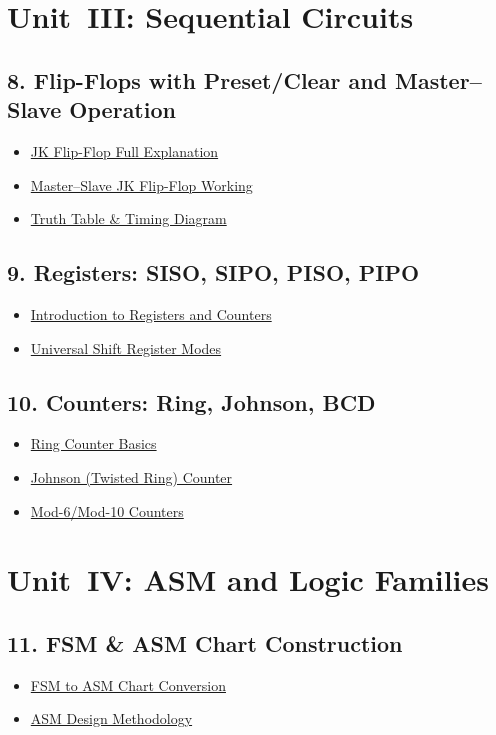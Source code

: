 \documentclass{article}
\begin{document}
\section*{Unit~III: Sequential Circuits}
\subsection*{8. Flip-Flops with Preset/Clear and Master–Slave Operation}
\begin{itemize}
  \item \href{https://www.youtube.com/watch?v=qU7x1XLjhn4}{JK Flip-Flop Full Explanation}
  \item \href{https://www.youtube.com/watch?v=rXHSB5w7CyE}{Master–Slave JK Flip-Flop Working}
  \item \href{https://www.youtube.com/watch?v=ID3og9nvNL0}{Truth Table \& Timing Diagram}
\end{itemize}
\subsection*{9. Registers: SISO, SIPO, PISO, PIPO}
\begin{itemize}
  \item \href{https://www.youtube.com/watch?v=16P7TgqQlTA}{Introduction to Registers and Counters}
  \item \href{https://www.youtube.com/watch?v=JbtqyvLu67c}{Universal Shift Register Modes}
\end{itemize}
\subsection*{10. Counters: Ring, Johnson, BCD}
\begin{itemize}
  \item \href{https://www.youtube.com/watch?v=esFP48kLxuw}{Ring Counter Basics}
  \item \href{https://www.youtube.com/watch?v=r80M7hOpzhA}{Johnson (Twisted Ring) Counter}
  \item \href{https://www.youtube.com/watch?v=2AKfM3w5FjM}{Mod-6/Mod-10 Counters}
\end{itemize}

\section*{Unit~IV: ASM and Logic Families}
\subsection*{11. FSM \& ASM Chart Construction}
\begin{itemize}
  \item \href{https://www.youtube.com/watch?v=T_t1tYM5YN4}{FSM to ASM Chart Conversion}
  \item \href{https://www.youtube.com/watch?v=vWu7fIbFKeY}{ASM Design Methodology}
\end{itemize}
\end{document}
